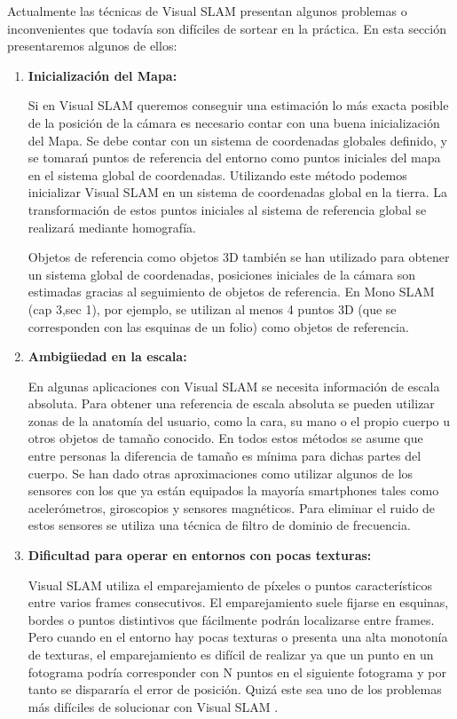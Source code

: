 Actualmente las técnicas de Visual SLAM presentan algunos problemas o inconvenientes que todavía son difíciles de sortear en la práctica. En esta sección presentaremos algunos de ellos:
\begin {enumerate}
\item \textbf{Inicialización del Mapa:}

Si en Visual SLAM queremos conseguir una estimación lo más exacta posible de la posición de la cámara es necesario contar con una buena inicialización del Mapa. Se debe contar con un sistema de coordenadas globales definido, y se tomarań puntos de referencia del entorno como puntos iniciales del mapa en el sistema global de coordenadas. Utilizando este método podemos inicializar Visual SLAM en un sistema de coordenadas global en la tierra. La transformación de estos puntos iniciales al sistema de referencia global se realizará mediante homografía.

Objetos de referencia como objetos 3D también se han utilizado para obtener un sistema global de coordenadas, posiciones iniciales de la cámara son estimadas gracias al seguimiento de objetos de referencia.
En Mono SLAM (cap 3,sec 1), por ejemplo, se utilizan al menos 4 puntos 3D (que se corresponden con las esquinas de un folio) como objetos de referencia.

\item \textbf{Ambigüedad en la escala:}

En algunas aplicaciones con Visual SLAM se necesita información de escala absoluta. Para obtener una referencia de escala absoluta se pueden utilizar zonas de la anatomía del usuario, como la cara, su mano o el propio cuerpo u otros objetos de tamaño conocido. En todos estos métodos se asume que entre personas la diferencia de tamaño es mínima para dichas partes del cuerpo. Se han dado otras aproximaciones como utilizar algunos de los sensores con los que ya están equipados la mayoría smartphones tales como acelerómetros, giroscopios y sensores magnéticos. Para eliminar el ruido de estos sensores se utiliza una técnica de filtro de dominio de frecuencia.


\item \textbf{Dificultad para operar en entornos con pocas texturas:}

Visual SLAM utiliza el emparejamiento de píxeles o puntos característicos entre varios frames consecutivos. El emparejamiento suele fijarse en esquinas, bordes  o puntos distintivos que fácilmente podrán localizarse entre frames. Pero cuando en el entorno hay pocas texturas o presenta una alta monotonía de texturas,  el emparejamiento es difícil de realizar ya que un punto en un fotograma podría corresponder con N puntos en el siguiente fotograma y por tanto se dispararía el error de posición. Quizá este sea uno de los problemas más difíciles de solucionar con Visual SLAM
\cite{Takafumi17}.


\end{enumerate}
